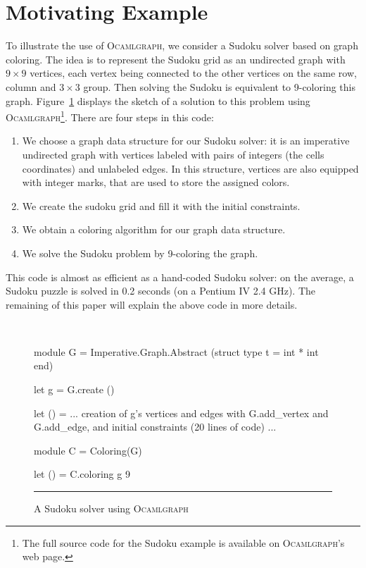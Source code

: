 \documentclass[tfpsymp]{tfp05symp}
\newcommand{\ocamlgraph}{\textsc{Ocamlgraph}\xspace}
\begin{document}
\section{Motivating Example}\label{motivatingexample}

To illustrate the use of \ocamlgraph, we consider a Sudoku solver
based on graph 
coloring.  The idea is to represent the Sudoku grid as an undirected
graph with $9\times 9$ vertices, each vertex being connected to the
other vertices on the same row, column and $3\times 3$ group. Then
solving the Sudoku is equivalent to 9-coloring this graph.
Figure~\ref{fig:sudoku} displays the sketch of a solution to
this problem using \ocamlgraph\footnote{The full source code for the
  Sudoku example is available on \ocamlgraph's web page.}. There are
four steps in this code:
\begin{enumerate}
\item We choose a graph data structure for our Sudoku solver: it is an
  imperative undirected graph with vertices labeled with pairs of
  integers (the cells coordinates) and unlabeled edges. 
  In this structure, vertices are also
  equipped with integer marks, that are used to store the assigned
  colors.
\item We create the sudoku grid and fill it with the initial
  constraints.
\item We obtain a coloring algorithm for our graph data structure.
\item We solve the Sudoku problem by 9-coloring the graph.
\end{enumerate}
This code is almost as efficient as a hand-coded Sudoku solver: on the
average, a Sudoku puzzle is solved in 0.2 seconds (on a Pentium IV 2.4 GHz).
The remaining of this paper will explain the above code in more details.

\begin{figure}[t]
\hrulefill\\[-2em]
\begin{center}
\begin{ocaml}
module G = Imperative.Graph.Abstract
             (struct type t = int * int end) 

let g = G.create ()

let () = 
  ... creation of g's vertices and edges with
      G.add_vertex and G.add_edge, and initial
      constraints (20 lines of code) ...

module C = Coloring(G)       

let () = C.coloring g 9
\end{ocaml}
\end{center}
\hrule

  \caption{A Sudoku solver using \ocamlgraph}
  \label{fig:sudoku}
\end{figure}
 
\end{document}
